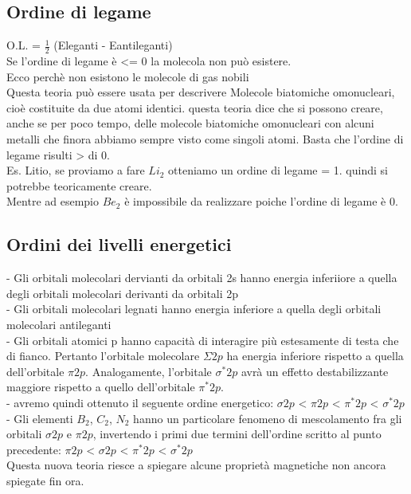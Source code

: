 \subsection{Ordine di legame}
O.L. = $\frac{1}{2}$ (Eleganti - Eantileganti)\\
Se l’ordine di legame è <= 0 la molecola non può esistere.\\
Ecco perchè non esistono le molecole di gas nobili\\
Questa teoria può essere usata per descrivere Molecole biatomiche omonucleari, cioè costituite da due atomi identici. questa teoria dice che si possono creare, anche se per poco tempo, delle molecole biatomiche omonucleari con alcuni metalli che finora abbiamo sempre visto come singoli atomi. Basta che l’ordine di legame risulti > di 0.\\
Es. Litio, se proviamo a fare $Li_2$ otteniamo un ordine di legame = 1. quindi si potrebbe teoricamente creare. \\
Mentre ad esempio $Be_2$ è impossibile da realizzare poiche l’ordine di legame è 0.
\subsection{Ordini dei livelli energetici}
\tab- Gli orbitali molecolari dervianti da orbitali 2s hanno energia inferiiore a quella degli orbitali molecolari derivanti da orbitali 2p\\
\tab- Gli orbitali molecolari legnati hanno energia inferiore a quella degli orbitali molecolari antileganti\\
\tab- Gli orbitali atomici p hanno capacità di interagire più estesamente di testa che di fianco. Pertanto l’orbitale molecolare $\Sigma 2p$ ha energia inferiore rispetto a quella dell’orbitale $\pi 2p$. Analogamente, l’orbitale $\sigma^*2p$ avrà un effetto destabilizzante maggiore rispetto a quello dell’orbitale $\pi^* 2p$.\\
\tab- avremo quindi ottenuto il seguente ordine energetico: $\sigma 2p$ < $\pi 2p$ < $\pi^* 2p$ < $\sigma^* 2p$\\
\tab- Gli elementi $B_2$, $C_2$, $N_2$ hanno un particolare fenomeno di mescolamento fra gli orbitali $\sigma 2p$ e $\pi 2p$, invertendo i primi due termini dell’ordine scritto al punto precedente: $\pi 2p$ < $\sigma 2p$ < $\pi^* 2p$ < $\sigma^*2p$\\
Questa nuova teoria riesce a spiegare alcune proprietà magnetiche non ancora spiegate fin ora.
